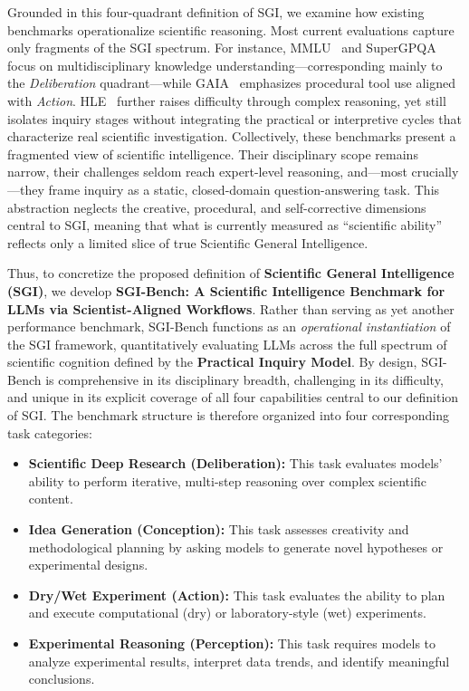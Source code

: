 Grounded in this four-quadrant definition of SGI, we examine how existing benchmarks operationalize scientific reasoning. Most current evaluations capture only fragments of the SGI spectrum. For instance, MMLU~\cite{hendrycks2020measuring} and SuperGPQA~\cite{du2025supergpqa} focus on multidisciplinary knowledge understanding—corresponding mainly to the \textit{Deliberation} quadrant—while GAIA~\cite{mialon2023gaia} emphasizes procedural tool use aligned with \textit{Action}. HLE~\cite{phan2025humanity} further raises difficulty through complex reasoning, yet still isolates inquiry stages without integrating the practical or interpretive cycles that characterize real scientific investigation.
Collectively, these benchmarks present a fragmented view of scientific intelligence. Their disciplinary scope remains narrow, their challenges seldom reach expert-level reasoning, and—most crucially—they frame inquiry as a static, closed-domain question-answering task. This abstraction neglects the creative, procedural, and self-corrective dimensions central to SGI, meaning that what is currently measured as “scientific ability” reflects only a limited slice of true Scientific General Intelligence.


Thus, to concretize the proposed definition of \textbf{Scientific General Intelligence (SGI)}, we develop \textbf{SGI-Bench: A Scientific Intelligence Benchmark for LLMs via Scientist-Aligned Workflows}. Rather than serving as yet another performance benchmark, SGI-Bench functions as an \emph{operational instantiation} of the SGI framework, quantitatively evaluating LLMs across the full spectrum of scientific cognition defined by the \textbf{Practical Inquiry Model}. By design, SGI-Bench is comprehensive in its disciplinary breadth, challenging in its difficulty, and unique in its explicit coverage of all four capabilities central to our definition of SGI. The benchmark structure is therefore organized into four corresponding task categories:
\begin{itemize}
\item \textbf{Scientific Deep Research (Deliberation):} This task evaluates models' ability to perform iterative, multi-step reasoning over complex scientific content.
\item \textbf{Idea Generation (Conception):} This task assesses creativity and methodological planning by asking models to generate novel hypotheses or experimental designs.
\item \textbf{Dry/Wet Experiment (Action):} This task evaluates the ability to plan and execute computational (dry) or laboratory-style (wet) experiments.
\item \textbf{Experimental Reasoning (Perception):} This task requires models to analyze experimental results, interpret data trends, and identify meaningful conclusions.
\end{itemize}

